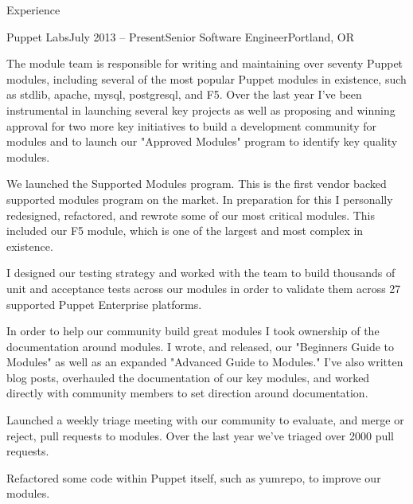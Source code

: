 \documentclass{resume} %
\begin{document}

\begin{rSection}{Experience}

\begin{rSubsection}{Puppet Labs}{July 2013 -- Present}{Senior Software Engineer}{Portland, OR}
\item[] The module team is responsible for writing and maintaining over seventy Puppet modules, including several of the most popular Puppet modules in existence, such as stdlib, apache, mysql, postgresql, and F5.  Over the last year I've been instrumental in launching several key projects as well as proposing and winning approval for two more key initiatives to build a development community for modules and to launch our "Approved Modules" program to identify key quality modules.

\item We launched the Supported Modules program.  This is the first vendor backed supported modules program on the market.  In preparation for this I personally redesigned, refactored, and rewrote some of our most critical modules.  This included our F5 module, which is one of the largest and most complex in existence.
\item I designed our testing strategy and worked with the team to build thousands of unit and acceptance tests across our modules in order to validate them across 27 supported Puppet Enterprise platforms.
\item In order to help our community build great modules I took ownership of the documentation around modules.  I wrote, and released, our "Beginners Guide to Modules" as well as an expanded "Advanced Guide to Modules."  I've also written blog posts, overhauled the documentation of our key modules, and worked directly with community members to set direction around documentation.
\item Launched a weekly triage meeting with our community to evaluate, and merge or reject, pull requests to modules.  Over the last year we've triaged over 2000 pull requests.
\item Refactored some code within Puppet itself, such as yumrepo, to improve our modules.
\end{rSubsection}



\end{rSection}
\end{document}
